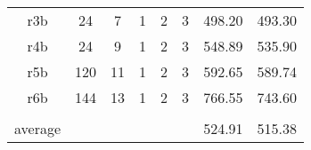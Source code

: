 \begin{table}[]
\begin{tabular}{ccclllll}
r3b     & 24                   &7                   & \multicolumn{1}{r}{1}    & \multicolumn{1}{r}{2}     & \multicolumn{1}{r}{3}   & \multicolumn{1}{r}{498.20}    & \multicolumn{1}{r}{493.30}     \\
r4b     & 24                   & 9                   & \multicolumn{1}{r}{1}    & \multicolumn{1}{r}{2}     & \multicolumn{1}{r}{3}   & \multicolumn{1}{r}{548.89}    & \multicolumn{1}{r}{535.90}     \\
r5b     & 120                 & 11                   & \multicolumn{1}{r}{1}    & \multicolumn{1}{r}{2}     & \multicolumn{1}{r}{3}   & \multicolumn{1}{r}{592.65}    & \multicolumn{1}{r}{589.74}     \\
r6b     & 144               & 13                   & \multicolumn{1}{r}{1}    & \multicolumn{1}{r}{2}     & \multicolumn{1}{r}{3}   & \multicolumn{1}{r}{766.55}    & \multicolumn{1}{r}{743.60}     \\
        & \multicolumn{1}{l}{} & \multicolumn{1}{l}{} &                          &                           &                         &                          &                           \\
average & \multicolumn{1}{l}{} & \multicolumn{1}{l}{} &                          &                           &                         &       \multicolumn{1}{r}{524.91 }                    &       \multicolumn{1}{r}{515.38}                     \\ \hline
\end{tabular}
\end{table}



%
